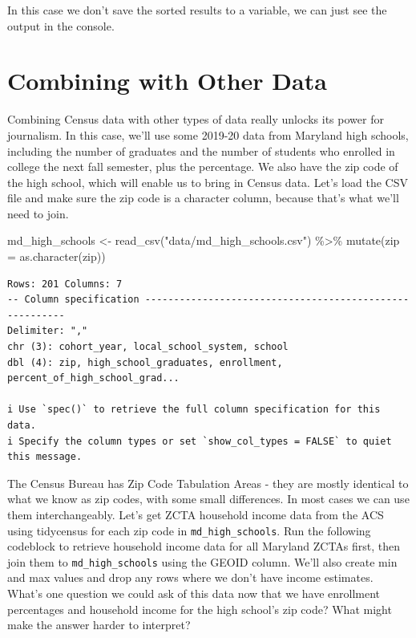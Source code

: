 \documentclass[
  letterpaper,
  DIV=11,
  numbers=noendperiod]{scrreprt}
\newenvironment{Shaded}{\begin{snugshade}}{\end{snugshade}}
\newcommand{\AttributeTok}[1]{\textcolor[rgb]{0.40,0.45,0.13}{#1}}
\newcommand{\FunctionTok}[1]{\textcolor[rgb]{0.28,0.35,0.67}{#1}}
\newcommand{\NormalTok}[1]{\textcolor[rgb]{0.00,0.23,0.31}{#1}}
\newcommand{\OtherTok}[1]{\textcolor[rgb]{0.00,0.23,0.31}{#1}}
\newcommand{\SpecialCharTok}[1]{\textcolor[rgb]{0.37,0.37,0.37}{#1}}
\newcommand{\StringTok}[1]{\textcolor[rgb]{0.13,0.47,0.30}{#1}}
\begin{document}
In this case we don't save the sorted results to a variable, we can just
see the output in the console.

\hypertarget{combining-with-other-data}{%
\section{Combining with Other Data}\label{combining-with-other-data}}

Combining Census data with other types of data really unlocks its power
for journalism. In this case, we'll use some 2019-20 data from Maryland
high schools, including the number of graduates and the number of
students who enrolled in college the next fall semester, plus the
percentage. We also have the zip code of the high school, which will
enable us to bring in Census data. Let's load the CSV file and make sure
the zip code is a character column, because that's what we'll need to
join.

\begin{Shaded}
\begin{Highlighting}[]
\NormalTok{md\_high\_schools }\OtherTok{\textless{}{-}} \FunctionTok{read\_csv}\NormalTok{(}\StringTok{"data/md\_high\_schools.csv"}\NormalTok{) }\SpecialCharTok{\%\textgreater{}\%}
  \FunctionTok{mutate}\NormalTok{(}\AttributeTok{zip =} \FunctionTok{as.character}\NormalTok{(zip))}
\end{Highlighting}
\end{Shaded}

\begin{verbatim}
Rows: 201 Columns: 7
-- Column specification --------------------------------------------------------
Delimiter: ","
chr (3): cohort_year, local_school_system, school
dbl (4): zip, high_school_graduates, enrollment, percent_of_high_school_grad...

i Use `spec()` to retrieve the full column specification for this data.
i Specify the column types or set `show_col_types = FALSE` to quiet this message.
\end{verbatim}

The Census Bureau has Zip Code Tabulation Areas - they are mostly
identical to what we know as zip codes, with some small differences. In
most cases we can use them interchangeably. Let's get ZCTA household
income data from the ACS using tidycensus for each zip code in
\texttt{md\_high\_schools}. Run the following codeblock to retrieve
household income data for all Maryland ZCTAs first, then join them to
\texttt{md\_high\_schools} using the GEOID column. We'll also create min
and max values and drop any rows where we don't have income estimates.
What's one question we could ask of this data now that we have
enrollment percentages and household income for the high school's zip
code? What might make the answer harder to interpret?
\end{document}
